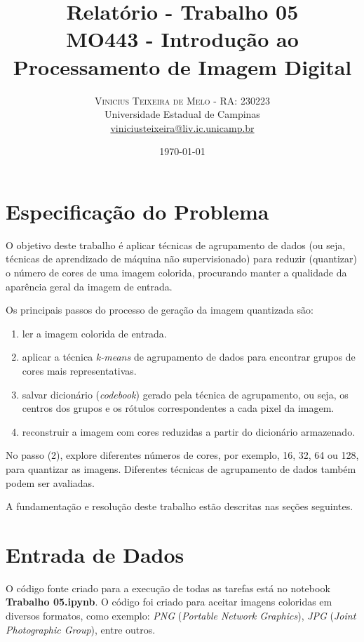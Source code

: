 \documentclass[twoside,twocolumn]{article}
\title{Relatório - Trabalho 05 \\ \Large MO443 - Introdução ao Processamento de Imagem Digital} %
\author{%
\textsc{Vinicius Teixeira de Melo - RA: 230223} \\[1ex] %
\normalsize Universidade Estadual de Campinas \\ %
\normalsize \href{mailto:viniciusteixeira@liv.ic.unicamp.br}{viniciusteixeira@liv.ic.unicamp.br} %
}
\date{\today} %
\begin{document}
\maketitle


\section{Especificação do Problema}

O objetivo deste trabalho é aplicar técnicas de agrupamento de dados (ou seja, técnicas de aprendizado de máquina não supervisionado) para reduzir (quantizar) o número de cores de uma imagem colorida, procurando manter a qualidade da aparência geral da imagem de entrada.

Os principais passos do processo de geração da imagem quantizada são:

\begin{enumerate}
	\item ler a imagem colorida de entrada.
	\item aplicar a técnica \textit{k-means} de agrupamento de dados para encontrar grupos de cores mais representativas.
	\item salvar dicionário (\textit{codebook}) gerado pela técnica de agrupamento, ou seja, os centros dos grupos e os rótulos correspondentes a cada pixel da imagem.
	\item reconstruir a imagem com cores reduzidas a partir do dicionário armazenado.
\end{enumerate}

No passo (2), explore diferentes números de cores, por exemplo, 16, 32, 64 ou 128, para quantizar as imagens. Diferentes técnicas de agrupamento de dados também podem ser avaliadas.

A fundamentação e resolução deste trabalho estão descritas nas seções seguintes.


\section{Entrada de Dados}

O código fonte criado para a execução de todas as tarefas está no notebook \textbf{Trabalho 05.ipynb}. O código foi criado para aceitar imagens coloridas em diversos formatos, como exemplo: \textit{PNG} (\textit{Portable Network Graphics}), \textit{JPG} (\textit{Joint Photographic Group}), entre outros.
\end{document}
